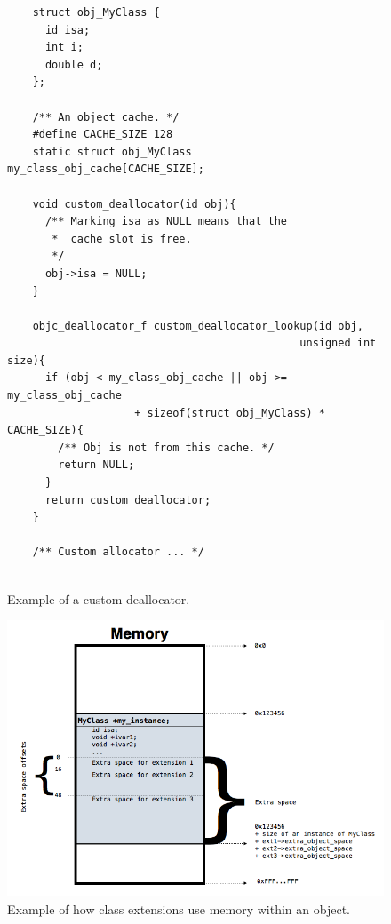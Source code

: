 \begin{figure}[H] 
  \begin{verbatim}
    struct obj_MyClass {
      id isa;
      int i;
      double d;
    };
    
    /** An object cache. */
    #define CACHE_SIZE 128
    static struct obj_MyClass my_class_obj_cache[CACHE_SIZE];
    
    void custom_deallocator(id obj){
      /** Marking isa as NULL means that the
       *  cache slot is free.
       */
      obj->isa = NULL;
    }
    
    objc_deallocator_f custom_deallocator_lookup(id obj, 
                                              unsigned int size){
      if (obj < my_class_obj_cache || obj >= my_class_obj_cache 
                    + sizeof(struct obj_MyClass) * CACHE_SIZE){
        /** Obj is not from this cache. */
        return NULL;
      }
      return custom_deallocator;
    }
    
    /** Custom allocator ... */
    
  \end{verbatim}
  \centering{}
  \caption{Example of a custom deallocator.}
  \label{fig:class_ext_dealloc_example}
\end{figure}

\begin{figure}[H] 
  
  \includegraphics[width=\textwidth]{img/class_extensions.png}
  
  \centering{}
  \caption{Example of how class extensions use memory within an object.}
  \label{fig:class_ext_mem_usage_img}
\end{figure}


